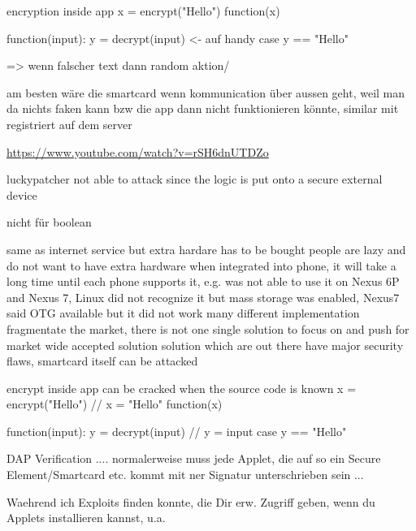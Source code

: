 encryption inside app
x = encrypt("Hello")
function(x)

function(input):
y = decrypt(input) <- auf handy
case y == "Hello"

=> wenn falscher text dann random aktion/


am besten wäre die smartcard wenn kommunication über aussen geht, weil man da nichts faken kann bzw die app dann nicht funktionieren könnte, similar mit registriert auf dem server

\url{https://www.youtube.com/watch?v=rSH6dnUTDZo}



luckypatcher not able to attack since the logic is put onto a secure external device

nicht für boolean

same as internet service but extra hardare has to be bought
people are lazy and do not want to have extra hardware
when integrated into phone, it will take a long time until each phone supports it, e.g. was not able to use it on Nexus 6P and Nexus 7, Linux did not recognize it but mass storage was enabled, Nexus7 said OTG available but it did not work
many different implementation fragmentate the market, there is not one single solution to focus on and push for market wide accepted solution
solution which are out there have major security flaws, smartcard itself can be attacked

encrypt inside app can be cracked when the source code is known
x = encrypt("Hello") // x = "Hello"
function(x)

function(input):
y = decrypt(input) // y = input
case y == "Hello"


DAP Verification .... normalerweise muss jede Applet, die auf so ein Secure Element/Smartcard etc. kommt mit ner Signatur unterschrieben sein ...


Waehrend ich Exploits finden konnte, die Dir erw. Zugriff geben, wenn du Applets installieren kannst, u.a.
